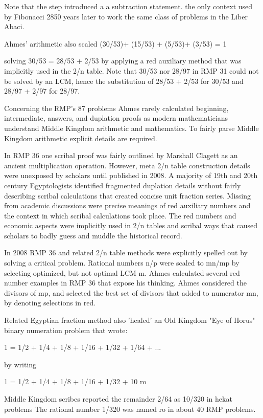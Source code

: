 \documentclass[12pt]{article}
\begin{document}
Note that the step introduced a a subtraction statement. the only context used by Fibonacci 2850 years later to work the same class of problems in the Liber Abaci.

Ahmes' arithmetic also scaled (30/53)+ (15/53) + (5/53)+ (3/53) = 1

solving 30/53 = 28/53 + 2/53 by applying a red auxiliary method that was implicitly used in the 2/n table. Note that 30/53 nor 28/97 in RMP 31 could not be solved by an LCM, hence the substitution of 28/53 + 2/53 for 30/53 and 28/97 + 2/97 for 28/97.  

Concerning the RMP's 87 problems Ahmes rarely calculated beginning, intermediate, answers, and duplation proofs as modern mathematicians understand Middle Kingdom arithmetic and mathematics. To fairly parse Middle Kingdom arithmetic explicit details are required.

In RMP 36 one scribal proof was fairly outlined by Marshall Clagett as an ancient multiplication operation. However, meta 2/n table construction details were unexposed by scholars until published in 2008. A majority of 19th and 20th century Egyptologists identified fragmented duplation details without fairly describing scribal calculations that created concise unit fraction series. Missing from academic discussions were precise meanings of red auxiliary numbers and the context in which scribal calculations took place. The red numbers and economic aspects were implicitly used in 2/n tables and scribal ways that caused scholars to badly guess and muddle the historical record. 

In 2008 RMP 36 and related 2/n table methods were explicitly spelled out by solving a critical problem. Rational numbers n/p were scaled to mn/mp by selecting optimized, but not optimal LCM m. Ahmes calculated several red number examples in RMP 36 that expose his thinking. Ahmes considered the divisors of mp, and selected the best set of divisors that added to numerator mn, by denoting selections in red.

Related Egyptian fraction method also 'healed' an Old Kingdom "Eye of Horus" binary numeration problem that wrote:

1 = 1/2 + 1/4 + 1/8 + 1/16 + 1/32 + 1/64 + ...

by writing

1 = 1/2 + 1/4 + 1/8 + 1/16 + 1/32 + 10 ro

Middle Kingdom scribes reported the remainder 2/64 as 10/320 in hekat problems The rational number 1/320 was named ro
in about 40 RMP problems.
\end{document}
